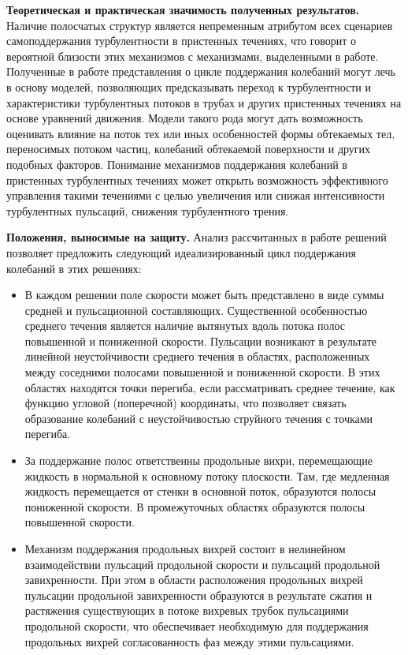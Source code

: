 {\bf Теоретическая и практическая значимость полученных результатов.}
Наличие полосчатых структур является непременным атрибутом всех сценариев самоподдержания турбулентности в пристенных течениях, что говорит о вероятной близости этих механизмов с механизмами, выделенными в работе. Полученные в работе представления о цикле поддержания колебаний могут лечь в основу моделей, позволяющих предсказывать переход к турбулентности и характеристики турбулентных потоков в трубах и других пристенных течениях на основе уравнений движения. Модели такого рода могут дать возможность оценивать влияние на поток тех или иных особенностей формы обтекаемых тел, переносимых потоком частиц, колебаний обтекаемой поверхности и других подобных факторов. Понимание механизмов поддержания колебаний в пристенных турбулентных течениях может открыть возможность эффективного управления такими течениями с целью увеличения или снижая интенсивности турбулентных пульсаций, снижения турбулентного трения.


{\bf Положения, выносимые на защиту.} Анализ рассчитанных в работе решений позволяет предложить следующий идеализированный цикл поддержания колебаний в этих решениях:
\begin{itemize}
\item В каждом решении поле скорости может быть представлено в виде суммы средней и пульсационной составляющих. Существенной особенностью среднего течения является наличие вытянутых вдоль потока полос повышенной и пониженной скорости. Пульсации возникают в результате линейной неустойчивости среднего течения в областях, расположенных между соседними полосами повышенной и пониженной скорости. В этих областях находятся точки перегиба, если рассматривать среднее течение, как функцию угловой (поперечной) координаты, что позволяет связать образование колебаний с неустойчивостью струйного течения с точками перегиба. 
\item За поддержание полос ответственны продольные вихри, перемещающие жидкость в нормальной к основному потоку плоскости. Там, где медленная жидкость перемещается от стенки в основной поток, образуются полосы пониженной скорости. В промежуточных областях образуются полосы повышенной скорости. 
\item Механизм поддержания продольных вихрей состоит в нелинейном взаимодействии пульсаций продольной скорости и пульсаций продольной завихренности. При этом в области расположения продольных вихрей пульсации продольной завихренности образуются в результате сжатия и растяжения существующих в потоке вихревых трубок пульсациями продольной скорости, что обеспечивает необходимую для поддержания продольных вихрей согласованность фаз между этими пульсациями. 
\end{itemize}

